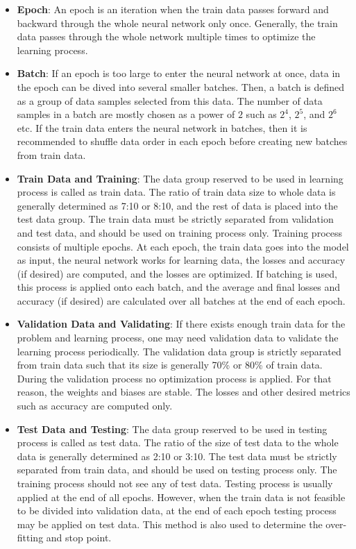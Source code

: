 \begin{itemize}
	\item \textbf{Epoch}: An epoch is an iteration when the train data passes forward and backward through the whole neural network only once. Generally, the train data passes through the whole network multiple times to optimize the learning process.
	
	\item \textbf{Batch}: If an epoch is too large to enter the neural network at once, data in the epoch can be dived into several smaller batches. Then, a batch is defined as a group of data samples selected from this data. The number of data samples in a batch are mostly chosen as a power of $2$ such as $2^4$, $2^5$, and  $2^6$ etc. If the train data enters the neural network in batches, then it is recommended to shuffle data order in each epoch before creating new batches from train data.
	
	\item \textbf{Train Data and Training}: The data group reserved to be used in learning process is called as train data. The ratio of train data size to whole data is generally determined as 7:10 or 8:10, and the rest of data is placed into the test data group. The train data must be strictly separated from validation and test data, and should be used on training process only. Training process consists of multiple epochs. At each epoch, the train data goes into the model as input, the neural network works for learning data, the losses and accuracy (if desired) are computed, and the losses are optimized. If batching is used, this process is applied onto each batch, and the average and final losses and accuracy (if desired) are calculated over all batches at the end of each epoch.
	
	\item \textbf{Validation Data and Validating}: If there exists enough train data for the problem and learning process, one may need validation data to validate the learning process periodically. The validation data group is strictly separated from train data such that its size is generally 70\% or 80\% of train data. During the validation process no optimization process is applied. For that reason, the weights and biases are stable. The losses and other desired metrics such as accuracy are computed only.
	
	\item \textbf{Test Data and Testing}: The data group reserved to be used in testing process is called as test data. The ratio of the size of test data to the whole data is generally determined as 2:10 or 3:10. The test data must be strictly separated from train data, and should be used on testing process only. The training process should not see any of test data. Testing process is usually applied at the end of all epochs. However, when the train data is not feasible to be divided into validation data, at the end of each epoch testing process may be applied on test data. This method is also used to determine the over-fitting and stop point.
	

\end{itemize}
